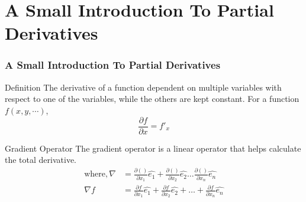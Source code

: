 \documentclass{beamer}
\begin{document}
\section{A Small Introduction To Partial Derivatives}
\begin{frame}
  \frametitle{A Small Introduction To Partial Derivatives}
\begin{block}{Definition}
The derivative of a function dependent on multiple variables with respect to one of the variables, while the others are kept constant. For a function $f(x,y,\cdots)$,
$$\frac{\partial f}{\partial x} = f'_x$$
\end{block}
\end{frame}

\begin{frame}
\begin{block}{Gradient Operator}
   The gradient operator is a linear operator that helps calculate the total derivative.
\begin{align*}
   \text{where}, \nabla &= \frac{\partial ()}{\partial x_1} \hat{e_1} + \frac{\partial ()}{\partial x_2} \hat{e_2} \dots \frac{\partial ()}{\partial x_n} \hat{e_n} \\
   \nabla f &= \frac{\partial f}{\partial x_1}\hat{e_1} + \frac{\partial f}{\partial x_2} \hat{e_2} + \dots + \frac{\partial f}{\partial x_n} \hat{e_n} \\
\end{align*}
\end{block}
\end{frame}
\end{document}
